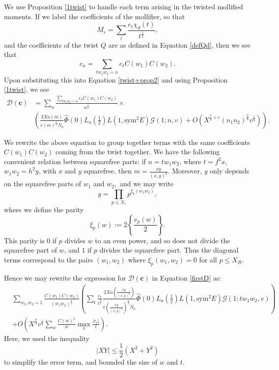\documentclass[12pt]{amsart}
\numberwithin{equation}{section}
\numberwithin{thm}{section}
\newcommand{\1}{\mathbf 1}
\begin{document}
We use Proposition \ref{1twist} to handle each term arising in the twisted mollified moments. If we label the coefficients of the mollifier, so that
\begin{equation}\label{Mcoef}M_r=\sum_{t}\frac{e_t\chi_d(t)}{t^{\frac{1}{2}}},\end{equation} and the coefficients of the twist $Q$ are as defined in Equation \eqref{defQd}, then we see that 
\begin{equation}\label{coefprod}
	c_n=\sum_{tw_1w_2=n}e_tC(w_1)C(w_2).
\end{equation}
Upon substituting this into Equation \eqref{twist+prop2} and using Proposition \ref{1twist}, we see
\begin{align}
		\mathscr{D}(\mathbf{c})&=\sum_{n}\frac{\sum_{tw_1w_2=n}\nonumber e_{t}C(w_1)C(w_2)}{n^{\frac{1}{2}}}\times\\&\left( \frac{2Xa\left(m\right)}{v \left(m\right)^{\frac{1}{2}}N_0}\hat{\Phi}(0)L_a\left(\frac{1}{2}\right)L(1, \text{sym}^2E)\mathcal{G}(1;n,v)+O(X^{\frac{7}{8}+\epsilon}(n_1n_2)^{\frac{3}{8}}v^{\frac{1}{4}})\right).\label{firstD} \end{align}

We rewrite the above equation to group together terms with the same coefficients  $C(w_1)C(w_2)$ coming from the twist together. We have the following convenient relation between squarefree parts: if $n=tw_1w_2$, where $t=f^2x$, $w_1w_2=h^2y$, with $x$ and $y$ squarefree, then $m=\frac{xy}{(x,y)^2}.$ Moreover, $y$ only depends on the squarefree parts of $w_1$ and $w_2,$ and we may write \begin{equation}
	y=\prod_{p\le X_r } p^{\xi_p( w_1w_2)},\end{equation} where we define the parity \begin{equation}\xi_p(w):=2\left\{\frac{v_p(w)}{2}\right\}.\end{equation}
	This parity is $0$ if $p$ divides $w$ to an even power, and so does not divide the squarefree part of $w$, and $1$ if $p$ divides the squarefree part. Thus the diagonal terms correspond to the pairs $(w_1,w_2)$ where $\xi_p(w_1,w_2)=0$ for all $p\le X_R.$	
	

Hence we may rewrite the expression for $\mathscr{D}(\mathbf{c})$ in Equation \eqref{firstD} as:
\begin{align}&\nonumber
		\sum_{w_1,w_2=1}\frac{C(w_1)C(w_2)}{(w_1w_2)^{\frac{1}{2}}}\left(\sum_{t} \frac{e_{t}}{t^{\frac{1}{2}}} \frac{2Xa\left(\frac{xy}{(x,y)^2}\right)}{v \left(\frac{xy}{(x,y)^2}\right)^{\frac{1}{2}}N_0}\hat{\Phi}(0)L_a\left(\frac{1}{2}\right)L(1, \text{sym}^2E)\mathcal{G}(1;tw_1w_2,v)\right)\\&
+O\left(X^{\frac{8}{9}}v^{\frac{1}{4}}\sum_{w}\frac{C(w)^2}{w} \max_t\frac{\left|e_{t}\right|}{t}
\right).
\end{align}
Here, we used the inequality \begin{equation}\label{CS2}
	\left|XY\right|\le \frac{1}{2}\left(X^2+Y^2\right)
\end{equation}to simplify the error term, and bounded the size of $w$ and $t$.
\end{document}
